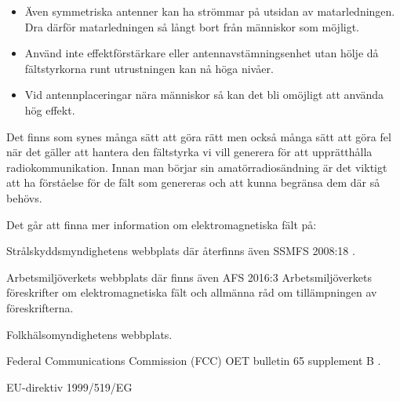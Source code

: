 \begin{itemize}
	\item Även symmetriska antenner kan ha strömmar på utsidan av matarledningen.
	Dra därför matarledningen så långt bort från människor som möjligt.

	\item Använd inte effektförstärkare eller antennavstämningsenhet utan
	hölje då fältstyrkorna runt utrustningen kan nå höga nivåer.

	\item Vid antennplaceringar nära människor så kan det bli omöjligt att
	använda hög effekt.
\end{itemize}

Det finns som synes många sätt att göra rätt men också många sätt att göra fel
när det gäller att hantera den fältstyrka vi vill generera för att upprätthålla
radiokommunikation.
Innan man börjar sin amatörradiosändning är det viktigt att ha förståelse för
de fält som genereras och att kunna begränsa dem där så behövs.

Det går att finna mer information om elektromagnetiska fält på:

Strålskyddsmyndighetens webbplats där återfinns även SSMFS 2008:18 \cite{SSMFS2008:18}.

Arbetsmiljöverkets webbplats där finns även AFS 2016:3 Arbetsmiljöverkets
föreskrifter om elektromagnetiska fält och allmänna råd om tillämpningen av
föreskrifterna.

Folkhälsomyndighetens webbplats.

Federal Communications Commission (FCC) OET bulletin 65 supplement B \cite{OETbul65b}.

EU-direktiv 1999/519/EG \cite{1999/519/EG}
